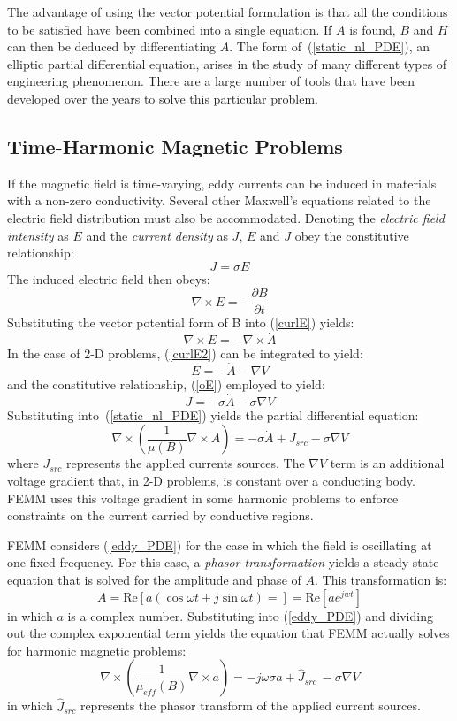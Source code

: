 \documentclass[12pt]{report}
\newcommand{\be}{\begin{equation}}
\newcommand{\ee}{\end{equation}}
\newcommand{\Curl}{\nabla \times}
\begin{document}
The advantage of using the vector potential formulation is that all
the conditions to be satisfied have been combined into a single
equation. If $A$ is found, $B$ and $H$ can then be deduced by
differentiating $A$. The form of~(\ref{static_nl_PDE}), an elliptic
partial differential equation, arises in the study of many
different types of engineering phenomenon. There are a large number
of tools that have been developed over the years to solve this
particular problem.

\subsection{Time-Harmonic Magnetic Problems}

If the magnetic field is time-varying, eddy currents can be induced
in materials with a non-zero conductivity. Several other Maxwell's
equations related to the electric field distribution must also be
accommodated. Denoting the {\em electric field intensity} as $E$
and the {\em current density} as $J$, $E$ and $J$ obey the
constitutive relationship:
\be \label{oE} J = \sigma E \ee
The induced electric field then obeys:
\be \label{curlE} \Curl E = -\frac{\partial B}{\partial t} \ee
Substituting the vector potential form of B into (\ref{curlE})
yields:
\be \label{curlE2} \Curl E = - \Curl \dot{A}\ee
In the case of 2-D problems, (\ref{curlE2}) can be integrated to
yield:
\be E = -\dot{A} - \nabla V \ee
and the constitutive relationship, (\ref{oE}) employed to yield:
\be J = - \sigma \dot{A} - \sigma \nabla V \ee
Substituting into~(\ref{static_nl_PDE}) yields the partial
differential equation:
\be \label{eddy_PDE} \nabla \times \left( \frac{1}{\mu(B)} \nabla \times A \right) =  - \sigma \dot{A} + J_{src} - \sigma \nabla V \ee
where $J_{src}$ represents the applied currents sources.  The
$\nabla V$ term is an additional voltage gradient that, in 2-D
problems, is constant over a conducting body.  FEMM uses this
voltage gradient in some harmonic problems to enforce constraints
on the current carried by conductive regions.

FEMM considers (\ref{eddy_PDE}) for the case in which the field is
oscillating at one fixed frequency.  For this case, a {\em phasor
transformation} \cite{Hoole} yields a steady-state equation that is
solved for the amplitude and phase of $A$.  This transformation is:
\be \label{phasor_transformation} A= \mbox{Re}\left[a (\cos \omega t + j \sin \omega t) = \right]
= \mbox{Re} \left[ a e^{j w t} \right] \ee
in which $a$ is a complex number.  Substituting into
(\ref{eddy_PDE}) and dividing out the complex exponential term
yields the equation that FEMM actually solves for harmonic magnetic
problems:
\be \label{harmonic_PDE} \nabla \times \left( \frac{1}{\mu_{eff}(B)} \nabla \times a \right) = - j \omega \sigma a + \hat{J}_{src} \ - \sigma \nabla V\ee
in which $\hat{J}_{src}$ represents the phasor transform of the
applied current sources.
\end{document}
